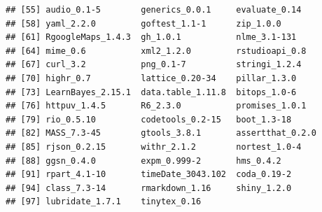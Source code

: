 \documentclass[12pt,a4paper,openany]{book}
\theoremstyle{definition}
\theoremstyle{definition}
\theoremstyle{definition}
\theoremstyle{remark}
\begin{document}
\begin{verbatim}
## [55] audio_0.1-5        generics_0.0.1     evaluate_0.14     
## [58] yaml_2.2.0         goftest_1.1-1      zip_1.0.0         
## [61] RgoogleMaps_1.4.3  gh_1.0.1           nlme_3.1-131      
## [64] mime_0.6           xml2_1.2.0         rstudioapi_0.8    
## [67] curl_3.2           png_0.1-7          stringi_1.2.4     
## [70] highr_0.7          lattice_0.20-34    pillar_1.3.0      
## [73] LearnBayes_2.15.1  data.table_1.11.8  bitops_1.0-6      
## [76] httpuv_1.4.5       R6_2.3.0           promises_1.0.1    
## [79] rio_0.5.10         codetools_0.2-15   boot_1.3-18       
## [82] MASS_7.3-45        gtools_3.8.1       assertthat_0.2.0  
## [85] rjson_0.2.15       withr_2.1.2        nortest_1.0-4     
## [88] ggsn_0.4.0         expm_0.999-2       hms_0.4.2         
## [91] rpart_4.1-10       timeDate_3043.102  coda_0.19-2       
## [94] class_7.3-14       rmarkdown_1.16     shiny_1.2.0       
## [97] lubridate_1.7.1    tinytex_0.16
\end{verbatim}
\end{document}
